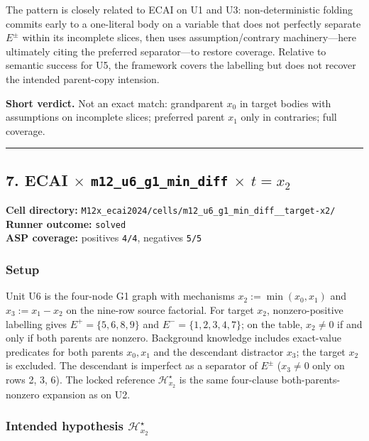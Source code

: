 \documentclass[11pt]{article}
\begin{document}
The pattern is closely related to ECAI on U1 and U3: non-deterministic folding commits early to a one-literal body on a variable that does not perfectly separate \(E^\pm\) within its incomplete slices, then uses assumption/contrary machinery---here ultimately citing the preferred separator---to restore coverage. Relative to semantic success for U5, the framework covers the labelling but does not recover the intended parent-copy intension.

\textbf{Short verdict.} Not an exact match: grandparent \(x_0\) in target bodies with assumptions on incomplete slices; preferred parent \(x_1\) only in contraries; full coverage.

\medskip\hrule\medskip

\subsection{\texorpdfstring{7. ECAI \(\times\) \texttt{m12\_u6\_g1\_min\_diff} \(\times\) \(t=x_2\)}{7. ECAI - m12-u6-g1-min-diff - target x2}}

\textbf{Cell directory:} \texttt{M12x\_ecai2024/cells/m12\_u6\_g1\_min\_diff\_\_target-x2/}\\
\textbf{Runner outcome:} \texttt{solved}\\
\textbf{ASP coverage:} positives \texttt{4/4}, negatives \texttt{5/5}

\subsubsection{Setup}

Unit U6 is the four-node G1 graph with mechanisms \(x_2:=\min(x_0,x_1)\) and \(x_3:=x_1-x_2\) on the nine-row source factorial. For target \(x_2\), nonzero-positive labelling gives \(E^+=\{5,6,8,9\}\) and \(E^-=\{1,2,3,4,7\}\); on the table, \(x_2\neq 0\) if and only if both parents are nonzero. Background knowledge includes exact-value predicates for both parents \(x_0,x_1\) and the descendant distractor \(x_3\); the target \(x_2\) is excluded. The descendant is imperfect as a separator of \(E^\pm\) (\(x_3\neq 0\) only on rows 2, 3, 6). The locked reference \(\mathcal{H}_{x_2}^\star\) is the same four-clause both-parents-nonzero expansion as on U2.

\subsubsection{\texorpdfstring{Intended hypothesis \(\mathcal{H}_{x_2}^\star\)}{Intended hypothesis H-star(x2)}}
\end{document}
